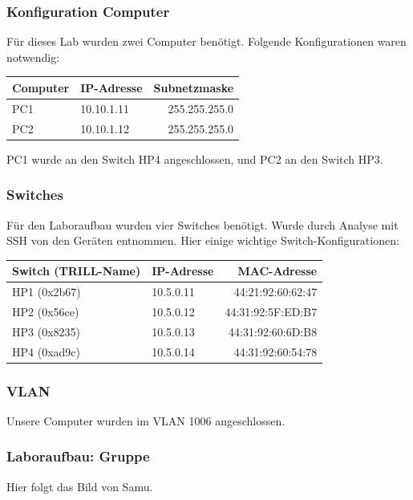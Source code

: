 \documentclass[a4,12pt]{scrartcl}
\begin{document}
\subsubsection{Konfiguration Computer}
Für dieses Lab wurden zwei Computer benötigt. Folgende Konfigurationen waren notwendig: 
\begin{center}
    \begin{tabular}{@{} l l r@{}}\toprule    
    {Computer} & {IP-Adresse} & {Subnetzmaske}\\ \midrule
    PC1 & 10.10.1.11 & 255.255.255.0\\ \addlinespace
    PC2 & 10.10.1.12 & 255.255.255.0\\ 
    \bottomrule
    \end{tabular}
\end{center}

\noindent PC1 wurde an den Switch HP4 angeschlossen, und PC2 an den Switch HP3. 

\subsubsection{Switches}
Für den Laboraufbau wurden vier Switches benötigt. Wurde durch Analyse mit SSH von den Geräten entnommen. Hier einige wichtige Switch-Konfigurationen: 
\begin{center}
    \begin{tabular}{@{} l l r@{}}\toprule    
    {Switch (TRILL-Name)} & {IP-Adresse} & {MAC-Adresse}\\ \midrule
    HP1 (0x2b67) & 10.5.0.11 & 44:21:92:60:62:47\\ \addlinespace
    HP2 (0x56ce) & 10.5.0.12 & 44:31:92:5F:ED:B7\\ \addlinespace
    HP3 (0x8235) & 10.5.0.13 & 44:31:92:60:6D:B8\\ \addlinespace
    HP4 (0xad9c) & 10.5.0.14 & 44:31:92:60:54:78\\
    \bottomrule
    \end{tabular}
\end{center}

\subsubsection{VLAN}
Unsere Computer wurden im VLAN 1006 angeschlossen. 

\subsubsection{Laboraufbau: Gruppe}
Hier folgt das Bild von Samu. 
\end{document}
